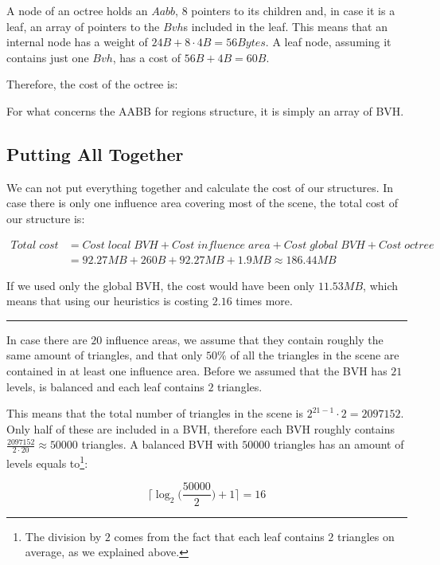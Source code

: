 \documentclass{PoliMi_MasterThesis}
\begin{document}
A node of an octree holds an $Aabb$, $8$ pointers to its children and, in case it is a leaf, an array of pointers to the $Bvh$s included in the leaf. This means that an internal node has a weight of $24B + 8 \cdot 4B = 56 Bytes$. A leaf node, assuming it contains just one $Bvh$, has a cost of $56B + 4B = 60B$.

Therefore, the cost of the octree is: 
\unboldmath

For what concerns the AABB for regions structure, it is simply an array of BVH.

\subsection*{Putting All Together}
We can not put everything together and calculate the cost of our structures. In case there is only one influence area covering most of the scene, the total cost of our structure is:

\begin{subequations}
	\begin{align*}
	Total\;cost &= Cost\;local\;BVH + Cost\;influence\;area + Cost\;global\;BVH + Cost\;octree\\
	&= 92.27MB + 260B + 92.27MB + 1.9MB \approx 186.44MB
	\end{align*}
\end{subequations}

If we used only the global BVH, the cost would have been only $11.53MB$, which means that using our heuristics is costing $2.16$ times more.

\noindent\rule{\textwidth}{1pt}
In case there are $20$ influence areas, we assume that they contain roughly the same amount of triangles, and that only $50\%$ of all the triangles in the scene are contained in at least one influence area. Before we assumed that the BVH has $21$ levels, is balanced and each leaf contains $2$ triangles. 

This means that the total number of triangles in the scene is $2^{21-1} \cdot 2 = 2097152$. Only half of these are included in a BVH, therefore each BVH roughly contains $\frac{2097152}{2\cdot 20} \approx 50000$ triangles. A balanced BVH with $50000$ triangles has an amount of levels equals to\footnote{The division by $2$ comes from the fact that each leaf contains $2$ triangles on average, as we explained above.}:

$$\Big\lceil\log_2\Big(\frac{50000}{2}\Big)+1\Big\rceil = 16$$ 
\end{document}
